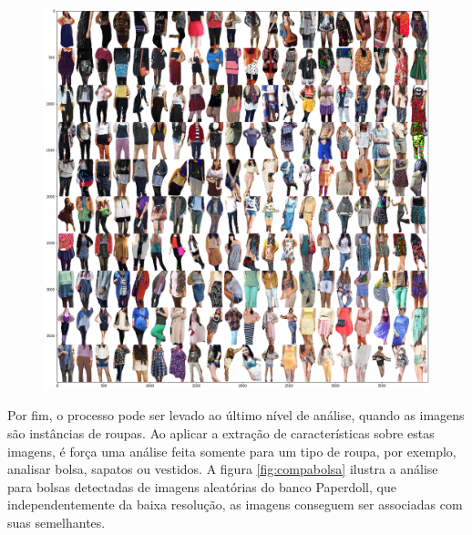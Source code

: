 \documentclass[12pt]{report}
\begin{document}
\begin{figure}
    \centering
    \includegraphics[scale=0.4]{images/resultados/rast2.png}
    \caption{}
    \label{fig:rast2}
\end{figure}

Por fim, o processo pode ser levado ao último nível de análise, quando as imagens são instâncias de roupas. Ao aplicar a extração de características sobre estas imagens, é força uma análise feita somente para um tipo de roupa, por exemplo, analisar bolsa, sapatos ou vestidos. A figura \ref{fig:compabolsa} ilustra a análise para bolsas detectadas de imagens aleatórias do banco Paperdoll, que independentemente da baixa resolução, as imagens conseguem ser associadas com suas semelhantes.
\end{document}
